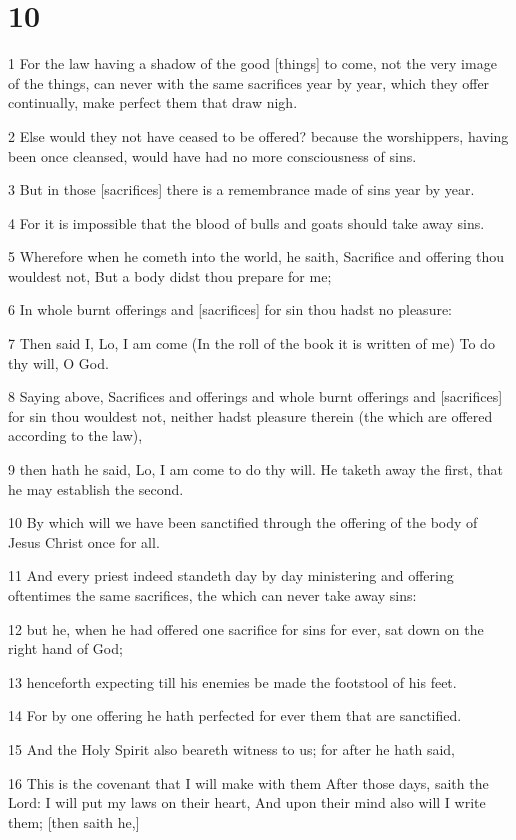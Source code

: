 \chapter{10}

\par 1 For the law having a shadow of the good [things] to come, not the very image of the things, can never with the same sacrifices year by year, which they offer continually, make perfect them that draw nigh.
\par 2 Else would they not have ceased to be offered? because the worshippers, having been once cleansed, would have had no more consciousness of sins.
\par 3 But in those [sacrifices] there is a remembrance made of sins year by year.
\par 4 For it is impossible that the blood of bulls and goats should take away sins.
\par 5 Wherefore when he cometh into the world, he saith, Sacrifice and offering thou wouldest not, But a body didst thou prepare for me;
\par 6 In whole burnt offerings and [sacrifices] for sin thou hadst no pleasure:
\par 7 Then said I, Lo, I am come (In the roll of the book it is written of me) To do thy will, O God.
\par 8 Saying above, Sacrifices and offerings and whole burnt offerings and [sacrifices] for sin thou wouldest not, neither hadst pleasure therein (the which are offered according to the law),
\par 9 then hath he said, Lo, I am come to do thy will. He taketh away the first, that he may establish the second.
\par 10 By which will we have been sanctified through the offering of the body of Jesus Christ once for all.
\par 11 And every priest indeed standeth day by day ministering and offering oftentimes the same sacrifices, the which can never take away sins:
\par 12 but he, when he had offered one sacrifice for sins for ever, sat down on the right hand of God;
\par 13 henceforth expecting till his enemies be made the footstool of his feet.
\par 14 For by one offering he hath perfected for ever them that are sanctified.
\par 15 And the Holy Spirit also beareth witness to us; for after he hath said,
\par 16 This is the covenant that I will make with them After those days, saith the Lord: I will put my laws on their heart, And upon their mind also will I write them; [then saith he,]
